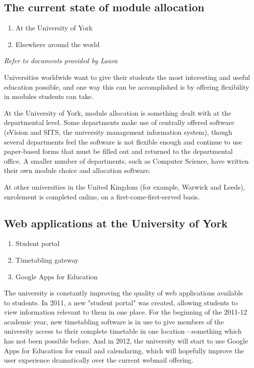 \documentclass[]{article}
\begin{document}
\subsection{The current state of module allocation}

\begin{enumerate}
  \item At the University of York
  \item Elsewhere around the world
\end{enumerate}

\textit{Refer to documents provided by Laura}

Universities worldwide want to give their students the most interesting and useful education possible, and one way this can be accomplished is by offering flexibility in modules students can take.

At the University of York, module allocation is something dealt with at the departmental level. Some departments make use of centrally offered software (eVision and SITS, the university management information system), though several departments feel the software is not flexible enough and continue to use paper-based forms that must be filled out and returned to the departmental office. A smaller number of departments, such as Computer Science, have written their own module choice and allocation software.

At other universities in the United Kingdom (for example, Warwick and Leeds), enrolement is completed online, on a first-come-first-served basis.

\subsection{Web applications at the University of York}

\begin{enumerate}
  \item Student portal
  \item Timetabling gateway
  \item Google Apps for Education
\end{enumerate}

The university is constantly improving the quality of web applications available to students. In 2011, a new "student portal" was created, allowing students to view information relevant to them in one place. For the beginning of the 2011-12 academic year, new timetabling software is in use to give members of the university access to their complete timetable in one location---something which has not been possible before. And in 2012, the university will start to use Google Apps for Education for email and calendaring, which will hopefully improve the user experience dramatically over the current webmail offering.
\end{document}
